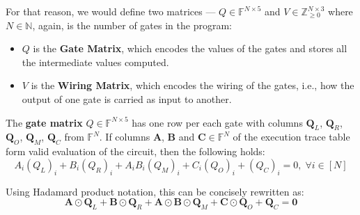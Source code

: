 \documentclass[../lecture-notes.tex]{subfiles}
\begin{document}
For that reason, we would define two matrices --- $Q \in \mathbb{F}^{N \times
5}$ and $V \in \mathbb{Z}_{\geq 0}^{N \times 3}$ where $N \in \mathbb{N}$, again, is the number of gates in the
program:
\begin{itemize}
    \item $Q$ is the \textbf{Gate Matrix}, which encodes the values of the gates and stores all the intermediate values computed.
    \item $V$ is the \textbf{Wiring Matrix}, which encodes the wiring of the gates, i.e., how the output of one gate is carried as input to another.
\end{itemize}

\begin{definition}
The \textbf{gate matrix} $Q \in \mathbb{F}^{N \times 5}$ has one row per each gate with columns $\mathbf{Q}_L$,
$\mathbf{Q}_R$, $\mathbf{Q}_O$, $\mathbf{Q}_M$, $\mathbf{Q}_C$ from
$\mathbb{F}^N$. If columns $\mathbf{A}$, $\mathbf{B}$ and $\mathbf{C} \in
\mathbb{F}^N$ of the execution trace table form valid evaluation of the circuit, 
then the following holds:
\begin{equation*}
    A_i (Q_{L})_i + B_i (Q_{R})_i + A_i B_i (Q_{M})_i + C_i (Q_{O})_i + (Q_{C})_i = 0, \; \forall i \in [N]    
\end{equation*}

Using Hadamard product notation, this can be concisely rewritten as:
\begin{equation*}
    \mathbf{A} \odot \mathbf{Q}_L + \mathbf{B} \odot \mathbf{Q}_R + \mathbf{A} \odot \mathbf{B} \odot \mathbf{Q}_M + \mathbf{C} \odot \mathbf{Q}_O + \mathbf{Q}_C = \mathbf{0}
\end{equation*}

\end{definition}
\end{document}
